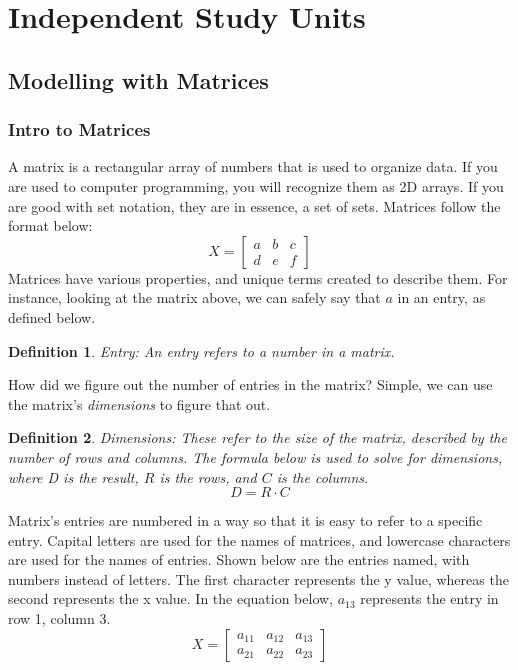 \documentclass[final,1p,12pt]{elsarticle}
\newtheorem{definition}{Definition}
\begin{document}
\section{Independent Study Units}

    \subsection{Modelling with Matrices}
    
        \subsubsection{Intro to Matrices}
        A matrix is a rectangular array of numbers that is used to organize data. If you are used to computer programming, you will recognize them as 2D arrays. If you are good with set notation, they are in essence, a set of sets. Matrices follow the format below:
        \begin{equation*}
            X =
            \begin{bmatrix}
                a & b & c \\
                d & e & f
            \end{bmatrix}
        \end{equation*}
        Matrices have various properties, and unique terms created to describe them. For instance, looking at the matrix above, we can safely say that $a$ in an entry, as defined below.
        \begin{definition}
            Entry: An entry refers to a number in a matrix.
        \end{definition}
        How did we figure out the number of entries in the matrix? Simple, we can use the matrix's \emph{dimensions} to figure that out.
        \begin{definition}Dimensions:
            These refer to the size of the matrix, described by the number of rows and columns. The formula below is used to solve for dimensions, where D is the result, $R$ is the rows, and $C$ is the columns.
            \begin{equation*}
                D = R \cdot C
            \end{equation*}
        \end{definition}
        Matrix's entries are numbered in a way so that it is easy to refer to a specific entry. Capital letters are used for the names of matrices, and lowercase characters are used for the names of entries. Shown below are the entries named, with numbers instead of letters. The first character represents the y value, whereas the second represents the x value. In the equation below, $a_{13}$ represents the entry in row 1, column 3.
        \begin{equation*}
            X =
            \begin{bmatrix}
                a_{11} & a_{12} & a_{13} \\
                a_{21} & a_{22} & a_{23}
            \end{bmatrix}
        \end{equation*}
        
\end{document}
